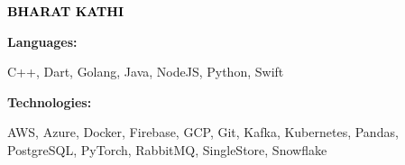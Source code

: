 \documentclass[9pt]{developercv} %
\begin{document}

\begin{minipage}[t]{0.5\textwidth} 
	\vspace{-\baselineskip} %
	
	{ \fontsize{16}{20} \textcolor{black}{\textbf{\MakeUppercase{Bharat Kathi}}}} %
	
	\vspace{6pt}
    \hspace{22pt}

    \hspace{12pt}
    
\end{minipage}
\hfill
\begin{minipage}[t]{0.5\textwidth}
    \vspace{-18pt}
    \vspace{-6pt}
    
    \begin{minipage}[t]{0.2\textwidth}
        \textbf{Languages:}
    \end{minipage}
    \hfill
    \begin{minipage}[t]{0.73\textwidth}
        C++, Dart, Golang, Java, NodeJS, Python, Swift
    \end{minipage}
    \vspace{5 pt}
    
    \begin{minipage}[t]{0.2\textwidth}
        \textbf{Technologies:}
    \end{minipage}
    \hfill
    \begin{minipage}[t]{0.73\textwidth}
        AWS, Azure, Docker, Firebase, GCP, Git, Kafka, Kubernetes, Pandas, PostgreSQL, PyTorch, RabbitMQ, SingleStore, Snowflake
    \end{minipage}
    
\end{minipage}
\end{document}
